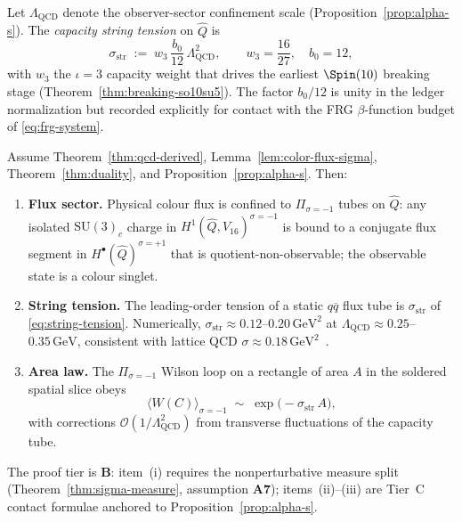 \begin{definition}\label{def:string-tension}
Let $\Lambda_{\mathrm{QCD}}$ denote the observer-sector confinement scale
(Proposition~\ref{prop:alpha-s}). The \emph{capacity string tension} on
$\hat Q$ is
\begin{equation}\label{eq:string-tension}
  \sigma_{\mathrm{str}}
  \;:=\;
  w_3\,\frac{b_0}{12}\,\Lambda_{\mathrm{QCD}}^{2},
  \qquad
  w_3=\frac{16}{27},\quad b_0=12,
\end{equation}
with $w_3$ the $\iota=3$ capacity weight that drives the earliest
$\Spin(10)$ breaking stage (Theorem~\ref{thm:breaking-so10su5}). The factor
$b_0/12$ is unity in the ledger normalization but recorded explicitly for
contact with the FRG $\beta$-function budget of \eqref{eq:frg-system}.
\end{definition}

\begin{theorem}
\label{thm:confinement}
Assume Theorem~\ref{thm:qcd-derived}, Lemma~\ref{lem:color-flux-sigma},
Theorem~\ref{thm:duality}, and Proposition~\ref{prop:alpha-s}. Then:
\begin{enumerate}[label=(\roman*),leftmargin=*]
  \item \textbf{Flux sector.} Physical colour flux is confined to
    $\Pi_{\sigma=-1}$ tubes on $\hat Q$: any isolated $\mathrm{SU}(3)_c$
    charge in $H^1(\hat Q,V_{16})^{\sigma=-1}$ is bound to a conjugate flux
    segment in $H^\bullet(\hat Q)^{\sigma=+1}$ that is
    quotient-non-observable; the observable state is a colour singlet.
  \item \textbf{String tension.} The leading-order tension of a static
    $q\overline{q}$ flux tube is $\sigma_{\mathrm{str}}$ of
    \eqref{eq:string-tension}. Numerically,
    $\sigma_{\mathrm{str}}\approx 0.12$--$0.20\,\mathrm{GeV}^2$ at
    $\Lambda_{\mathrm{QCD}}\approx 0.25$--$0.35\,\mathrm{GeV}$, consistent
    with lattice QCD $\sigma\approx 0.18\,\mathrm{GeV}^2$~\cite{PDG2025}.
  \item \textbf{Area law.} The $\Pi_{\sigma=-1}$ Wilson loop on a
    rectangle of area $A$ in the soldered spatial slice obeys
    \begin{equation}\label{eq:area-law}
      \langle W(C)\rangle_{\sigma=-1}
      \;\sim\;
      \exp\!\bigl(-\sigma_{\mathrm{str}}\,A\bigr),
    \end{equation}
    with corrections $\mathcal{O}(1/\Lambda_{\mathrm{QCD}}^2)$ from
    transverse fluctuations of the capacity tube.
\end{enumerate}
The proof tier is \textbf{B}: item~(i) requires the nonperturbative measure
split (Theorem~\ref{thm:sigma-measure}, assumption \textbf{A7}); items~(ii)--(iii)
are Tier~C contact formulae anchored to Proposition~\ref{prop:alpha-s}.
\end{theorem}


